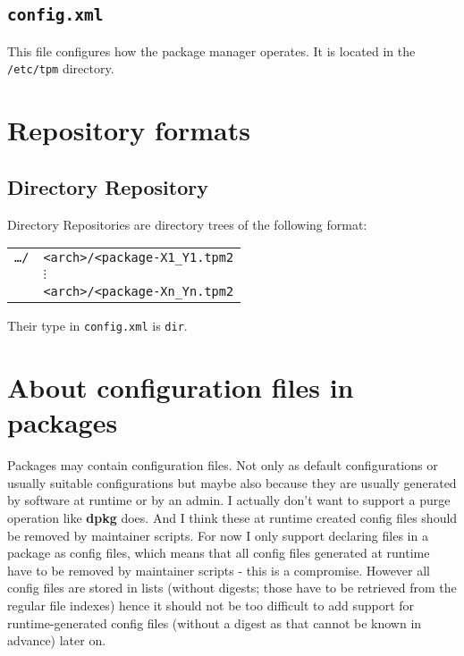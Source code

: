 \documentclass[a4paper]{scrartcl}
\newcommand{\file}[1]{\texttt{#1}}
\newcommand{\program}[1]{\textbf{#1}}
\begin{document}
	\subsection{\file{config.xml}}
	\label{ssec:config.xml}
	
	This file configures how the package manager operates. It is located in the \file{/etc/tpm} directory.
	
	\noindent

	
	\section{Repository formats}
	\label{sec:repository_formats}
	
	
	\subsection{Directory Repository}
	\label{ssec:directory_repository}
	
	Directory Repositories are directory trees of the following format:
	
	\vspace{1em}	
	\noindent
	\begin{tabular}{rl}
		\file{\dots/} & \file{<arch>/<package-X1\_Y1.tpm2} \\
		& \hspace{0.5cm} $\vdots$ \\
		& \file{<arch>/<package-Xn\_Yn.tpm2} \\
	\end{tabular}

	\vspace{1em}
	Their type in \file{config.xml} is \texttt{dir}.
	
	
	\section{About configuration files in packages}
	\label{sec:about_configuration_files_in_pacakges}
	
	Packages may contain configuration files. Not only as default configurations or usually suitable configurations but maybe also because they are usually generated by software at runtime or by an admin. I actually don't want to support a purge operation like \program{dpkg} does. And I think these at runtime created config files should be removed by maintainer scripts. For now I only support declaring files in a package as config files, which means that all config files generated at runtime have to be removed by maintainer scripts - this is a compromise. However all config files are stored in lists (without digests; those have to be retrieved from the regular file indexes) hence it should not be too difficult to add support for runtime-generated config files (without a digest as that cannot be known in advance) later on.
	
\end{document}
